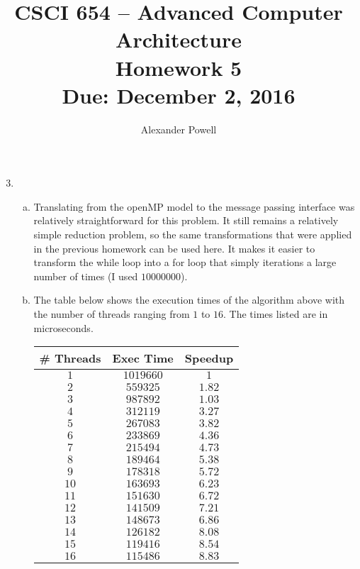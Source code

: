\documentclass[10pt]{article} %
\title{CSCI 654 -- Advanced Computer Architecture \\
Homework 5 \\
{\large{\bf Due: December 2, 2016}}}
\date{}
\author{Alexander Powell}
\begin{document}
\maketitle
\begin{enumerate}[1.]
\setcounter{enumi}{2}
\item %

\begin{enumerate}[(a)]
\item %

Translating from the openMP model to the message passing interface was relatively straightforward for this problem.  It still remains a relatively simple reduction problem, so the same transformations that were applied in the previous homework can be used here.  It makes it easier to transform the while loop into a for loop that simply iterations a large number of times (I used $10000000$).  

\item %

The table below shows the execution times of the algorithm above with the number of threads ranging from $1$ to $16$.  The times listed are in microseconds.  

\begin{center}
\begin{tabular}{| c | c | c |}
\hline
\# Threads & Exec Time & Speedup \\
\hline
$1$ & $1019660$ & $1$ \\
$2$ & $559325$ & $1.82$ \\
$3$ & $987892$ & $1.03$ \\
$4$ & $312119$ & $3.27$ \\
$5$ & $267083$ & $3.82$ \\
$6$ & $233869$ & $4.36$ \\
$7$ & $215494$ & $4.73$ \\
$8$ & $189464$ & $5.38$ \\
$9$ & $178318$ & $5.72$ \\
$10$ & $163693$ & $6.23$ \\
$11$ & $151630$ & $6.72$ \\
$12$ & $141509$ & $7.21$ \\
$13$ & $148673$ & $6.86$ \\
$14$ & $126182$ & $8.08$ \\
$15$ & $119416$ & $8.54$ \\
$16$ & $115486$ & $8.83$ \\
\hline
\end{tabular}
\end{center}


\end{enumerate}
\end{enumerate}
\end{document}
